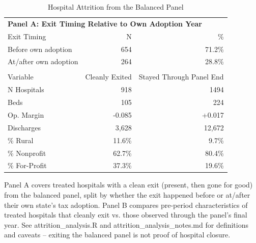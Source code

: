 \begin{table}[!h]
\centering
\caption{Hospital Attrition from the Balanced Panel}
\begin{tabular}{lrr}
\toprule
\multicolumn{3}{l}{\textbf{Panel A: Exit Timing Relative to Own Adoption Year}}\\
Exit Timing & N & \% \\
\midrule
Before own adoption & 654 & 71.2\% \\
At/after own adoption & 264 & 28.8\% \\
\addlinespace
\multicolumn{3}{l}{\textbf{Panel B: Pre-Period Characteristics, Cleanly Exited vs. Stayed}}\\
Variable & Cleanly Exited & Stayed Through Panel End \\
\midrule
N Hospitals & 918 & 1494 \\
Beds & 105 & 224 \\
Op. Margin & -0.085 & +0.017 \\
Discharges & 3,628 & 12,672 \\
\% Rural & 11.6\% & 9.7\% \\
\% Nonprofit & 62.7\% & 80.4\% \\
\% For-Profit & 37.3\% & 19.6\% \\
\bottomrule
\end{tabular}
\footnotesize{Panel A covers treated hospitals with a clean exit (present, then gone for good) from the balanced panel, split by whether the exit happened before or at/after their own state's tax adoption. Panel B compares pre-period characteristics of treated hospitals that cleanly exit vs. those observed through the panel's final year. See attrition\_analysis.R and attrition\_analysis\_notes.md for definitions and caveats -- exiting the balanced panel is not proof of hospital closure.}
\end{table}
